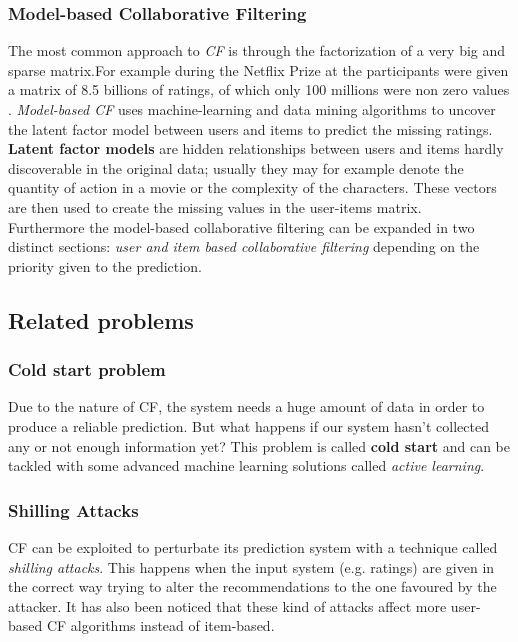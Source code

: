 \documentclass{sig-alternate-05-2015}
\begin{document}
\subsubsection{Model-based Collaborative Filtering}
The most common approach to \textit{CF} is through the factorization
of a very big and sparse matrix.For example during the Netflix
Prize at the participants were given a matrix of 8.5 billions of ratings,
of which only 100 millions were non zero values \cite{netflix-prize} .
\textit{Model-based CF} uses machine-learning and data mining algorithms
to uncover the latent factor model between users and items to
predict the missing ratings. \textbf{Latent factor models} are hidden
relationships between users and items hardly discoverable in the original data;
usually they may for example denote the quantity of action in a movie or the complexity
of the characters. These vectors are then used to create the missing values in the user-items
matrix.\\


Furthermore the model-based collaborative filtering can be expanded in two distinct sections:
\textit{user and item based collaborative filtering} depending on the priority given to the
prediction.


\subsection{Related problems}
\subsubsection{Cold start problem}
Due to the nature of CF, the system needs a huge amount of data
in order to produce a reliable prediction. But what happens if our system
hasn't collected any or not enough information yet?
This problem is called \textbf{cold start} and can be tackled with some advanced
machine learning solutions called \textit{active learning}.

\subsubsection{Shilling Attacks}
CF can be exploited to perturbate its prediction system with a technique
called \textit{shilling attacks}. This happens when the input system (e.g. ratings)
are given in the correct way trying to alter the recommendations to the one
favoured by the attacker. It has also been noticed that these kind of attacks affect
more user-based CF algorithms instead of item-based.\cite{survery-cf}
\end{document}
